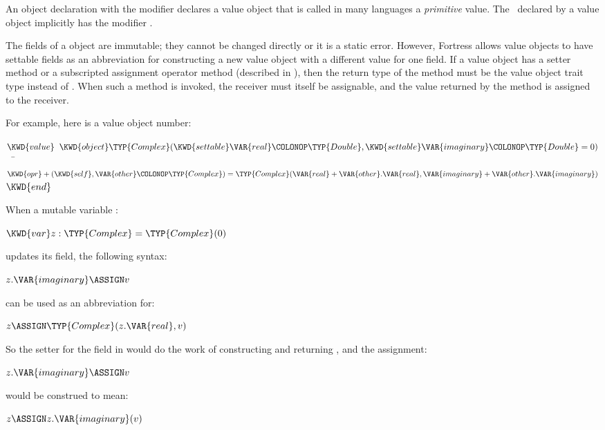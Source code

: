 An object declaration with the modifier  declares a value object
that is called in many languages a \emph{primitive} value.
The \objecttype\ declared by a value object implicitly has the modifier
.



The fields of a  object are immutable;
they cannot be changed directly or it is a static error.
However, Fortress allows value objects to have settable fields
as an abbreviation for constructing a new value object with a different
value for one field.
If a value object has a setter method or a subscripted assignment operator
method (described in ),
then the return type of the method must be the value object trait type
instead of \EXP{()}.  When such a method is invoked, the receiver
must itself be assignable, and the value returned by the method
is assigned to the receiver.


For example, here is a value object  number:
\begin{Fortress}
\(\KWD{value}\;\;\KWD{object} \TYP{Complex}(\KWD{settable} \VAR{real}\COLONOP\TYP{Double}, \KWD{settable} \VAR{imaginary}\COLONOP\TYP{Double}=0)\)\\
{\tt~~}\pushtabs\=\+\(  \KWD{opr} +(\KWD{self},\VAR{other}\COLONOP\TYP{Complex}) = \TYP{Complex}(\VAR{real} + \VAR{other}.\VAR{real}, \VAR{imaginary} + \VAR{other}.\VAR{imaginary})\)\-\\\poptabs
\(\KWD{end}\)
\end{Fortress}
When a mutable variable :
\begin{Fortress}
\(\KWD{var} z \mathrel{\mathtt{:}} \TYP{Complex} = \TYP{Complex}(0)\)
\end{Fortress}
updates its  field, the following syntax:
\begin{Fortress}
\(z.\VAR{imaginary} \ASSIGN v\)
\end{Fortress}
can be used as an abbreviation for:
\begin{Fortress}
\(z \ASSIGN \TYP{Complex}(z.\VAR{real}, v)\)
\end{Fortress}
So the setter for the field  in  would do the
work of constructing and returning
, and the assignment:
\begin{Fortress}
\(z.\VAR{imaginary} \ASSIGN v\)
\end{Fortress}
would be construed to mean:
\begin{Fortress}
\(z \ASSIGN z.\VAR{imaginary}(v)\)
\end{Fortress}


